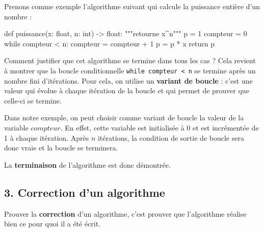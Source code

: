 \documentclass[
  a4paper,
  DIV=11,
  numbers=noendperiod]{scrartcl}
\newenvironment{Shaded}{\begin{snugshade}}{\end{snugshade}}
\newcommand{\BuiltInTok}[1]{\textcolor[rgb]{0.00,0.23,0.31}{#1}}
\newcommand{\CommentTok}[1]{\textcolor[rgb]{0.37,0.37,0.37}{#1}}
\newcommand{\ControlFlowTok}[1]{\textcolor[rgb]{0.00,0.23,0.31}{#1}}
\newcommand{\DecValTok}[1]{\textcolor[rgb]{0.68,0.00,0.00}{#1}}
\newcommand{\KeywordTok}[1]{\textcolor[rgb]{0.00,0.23,0.31}{#1}}
\newcommand{\NormalTok}[1]{\textcolor[rgb]{0.00,0.23,0.31}{#1}}
\newcommand{\OperatorTok}[1]{\textcolor[rgb]{0.37,0.37,0.37}{#1}}
\begin{document}
Prenons comme exemple l'algorithme suivant qui calcule la puissance
entière d'un nombre :

\begin{Shaded}
\begin{Highlighting}[]
\KeywordTok{def}\NormalTok{ puissance(x: }\BuiltInTok{float}\NormalTok{, n: }\BuiltInTok{int}\NormalTok{) }\OperatorTok{{-}\textgreater{}} \BuiltInTok{float}\NormalTok{:}
    \CommentTok{"""retourne x\^{}n"""}
\NormalTok{    p }\OperatorTok{=} \DecValTok{1}
\NormalTok{    compteur }\OperatorTok{=} \DecValTok{0}
    \ControlFlowTok{while}\NormalTok{ compteur }\OperatorTok{\textless{}}\NormalTok{ n:}
\NormalTok{        compteur }\OperatorTok{=}\NormalTok{ compteur }\OperatorTok{+} \DecValTok{1}
\NormalTok{        p }\OperatorTok{=}\NormalTok{ p }\OperatorTok{*}\NormalTok{ x}
    \ControlFlowTok{return}\NormalTok{ p}
\end{Highlighting}
\end{Shaded}

Comment justifier que cet algorithme se termine dans tous les cas ? Cela
revient à montrer que la boucle conditionnelle
\texttt{while\ compteur\ \textless{}\ n} se termine après un nombre fini
d'itérations. Pour cela, on utilise un \textbf{variant de boucle} :
c'est une valeur qui évolue à chaque itération de la boucle et qui
permet de prouver que celle-ci se termine.

Dans notre exemple, on peut choisir comme variant de boucle la valeur de
la variable \(compteur\). En effet, cette variable est initialisée à 0
et est incrémentée de 1 à chaque itération. Après \(n\) itérations, la
condition de sortie de boucle sera donc vraie et la boucle se terminera.

La \textbf{terminaison} de l'algorithme est donc démontrée.

\hypertarget{correction-dun-algorithme}{%
\subsection{3. Correction d'un
algorithme}\label{correction-dun-algorithme}}

\begin{tcolorbox}[enhanced jigsaw, bottomrule=.15mm, leftrule=.75mm, opacitybacktitle=0.6, breakable, opacityback=0, toprule=.15mm, colback=white, toptitle=1mm, colbacktitle=quarto-callout-tip-color!10!white, left=2mm, title=\textcolor{quarto-callout-tip-color}{\faLightbulb}\hspace{0.5em}{Définition}, colframe=quarto-callout-tip-color-frame, arc=.35mm, rightrule=.15mm, titlerule=0mm, bottomtitle=1mm, coltitle=black]

Prouver la \textbf{correction} d'un algorithme, c'est prouver que
l'algorithme réalise bien ce pour quoi il a été écrit.

\end{tcolorbox}
\end{document}
